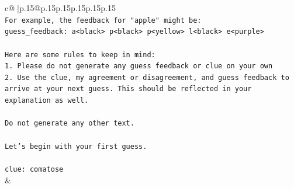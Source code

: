 \documentclass{article}
\begin{document}
{\begin{supertabular}{c@{$\;$}|p{.15\linewidth}@{}p{.15\linewidth}p{.15\linewidth}p{.15\linewidth}p{.15\linewidth}p{.15\linewidth}}
{{{\\ 
\texttt{For example, the feedback for "apple" might be:} \\
\texttt{guess\_feedback: a<black> p<black> p<yellow> l<black> e<purple>} \\
\\ 
\texttt{Here are some rules to keep in mind:} \\
\texttt{1. Please do not generate any guess feedback or clue on your own} \\
\texttt{2. Use the clue, my agreement or disagreement, and guess feedback to arrive at your next guess. This should be reflected in your explanation as well.} \\
\\ 
\texttt{Do not generate any other text.} \\
\\ 
\texttt{Let's begin with your first guess.} \\
\\ 
\texttt{clue: comatose} \\
            }
        }
    }
    & \\ \\


\end{supertabular}}
\end{document}
